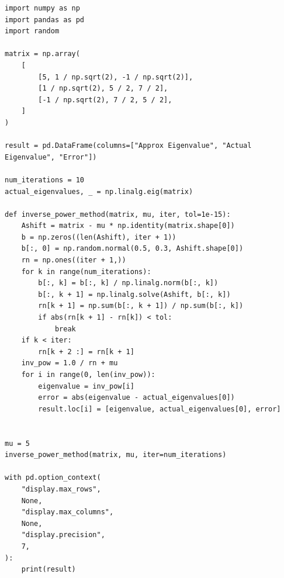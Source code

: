 \documentclass[12pt,
               a4paper,
               article,
               oneside,
               english,oldfontcommands]{memoir}
\begin{document}
\begin{lstlisting}[caption= Inverse Iteration with shift, label={lst: inv shift}]
import numpy as np
import pandas as pd
import random

matrix = np.array(
    [
        [5, 1 / np.sqrt(2), -1 / np.sqrt(2)],
        [1 / np.sqrt(2), 5 / 2, 7 / 2],
        [-1 / np.sqrt(2), 7 / 2, 5 / 2],
    ]
)

result = pd.DataFrame(columns=["Approx Eigenvalue", "Actual Eigenvalue", "Error"])

num_iterations = 10
actual_eigenvalues, _ = np.linalg.eig(matrix)

def inverse_power_method(matrix, mu, iter, tol=1e-15):
    Ashift = matrix - mu * np.identity(matrix.shape[0])
    b = np.zeros((len(Ashift), iter + 1))
    b[:, 0] = np.random.normal(0.5, 0.3, Ashift.shape[0])
    rn = np.ones((iter + 1,))
    for k in range(num_iterations):
        b[:, k] = b[:, k] / np.linalg.norm(b[:, k])
        b[:, k + 1] = np.linalg.solve(Ashift, b[:, k])
        rn[k + 1] = np.sum(b[:, k + 1]) / np.sum(b[:, k])
        if abs(rn[k + 1] - rn[k]) < tol:
            break
    if k < iter:
        rn[k + 2 :] = rn[k + 1]
    inv_pow = 1.0 / rn + mu
    for i in range(0, len(inv_pow)):
        eigenvalue = inv_pow[i]
        error = abs(eigenvalue - actual_eigenvalues[0])
        result.loc[i] = [eigenvalue, actual_eigenvalues[0], error]


mu = 5
inverse_power_method(matrix, mu, iter=num_iterations)

with pd.option_context(
    "display.max_rows",
    None,
    "display.max_columns",
    None,
    "display.precision",
    7,
):
    print(result)
\end{lstlisting}    
\end{document}
